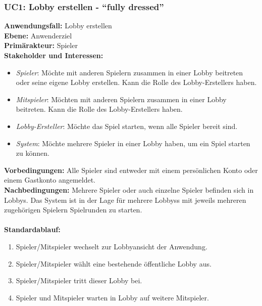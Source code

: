 \documentclass[11pt,ngerman]{article}
\newcommand{\quotes}[1]{``#1''}
\begin{document}
    \subsubsection{UC1: Lobby erstellen - \quotes{fully dressed}}
    \label{ssec:UC1Lobbyerstellen}
    \begin{tcolorbox}[enhanced, breakable, sharp corners, width=\dimexpr\textwidth-15mm\relax ,enlarge left by=10mm ,fontupper=\linespread{1.1}\selectfont, boxrule=1pt, title={UC1: Lobby erstellen}, colback=white, colframe=gray!22, coltitle=black]

    	\textbf{Anwendungsfall:} Lobby erstellen \\
    	\textbf{Ebene:} Anwenderziel \\
    	\textbf{Primärakteur:} Spieler \\
    	\textbf{Stakeholder und Interessen:}
    	\begin{itemize}
    		\item \textit{Spieler}: Möchte mit anderen Spielern zusammen in einer \Gls{Lobby} beitreten oder seine eigene \Gls{Lobby} erstellen. Kann die Rolle des Lobby-Erstellers haben.
    		\item \textit{Mitspieler}: Möchten mit anderen Spielern zusammen in einer \Gls{Lobby} beitreten. Kann die Rolle des Lobby-Erstellers haben.
    		\item \textit{Lobby-Ersteller}: Möchte das Spiel starten, wenn alle Spieler bereit sind.
    		\item \textit{System}: Möchte mehrere Spieler in einer \Gls{Lobby} haben, um ein Spiel starten zu können.
    	\end{itemize}
    	\textbf{Vorbedingungen:} Alle Spieler sind entweder mit einem persönlichen Konto oder einem Gastkonto angemeldet.\\
    	\textbf{Nachbedingungen:} Mehrere Spieler oder auch einzelne Spieler befinden sich in \Glspl{Lobby}. Das System ist in der Lage für mehrere \Glspl{Lobby}s mit jeweils mehreren zugehörigen Spielern Spielrunden zu starten. \\
    	\\  \textbf{Standardablauf:}
    	\begin{enumerate}
    		\item Spieler/Mitspieler wechselt zur Lobbyansicht der Anwendung.
    		\item Spieler/Mitspieler wählt eine bestehende öffentliche \Gls{Lobby} aus.
    		\item Spieler/Mitspieler tritt dieser \Gls{Lobby} bei.
    		\item Spieler und Mitspieler warten in \Gls{Lobby} auf weitere Mitspieler.

\end{enumerate}
\end{tcolorbox}
\end{document}
